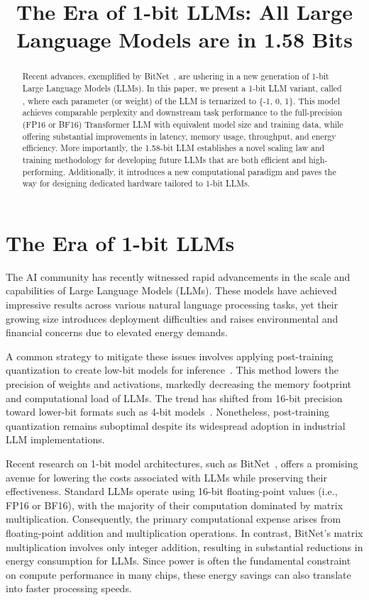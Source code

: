 \title{The Era of 1-bit LLMs: All Large Language Models are in 1.58 Bits}

\begin{abstract}
Recent advances, exemplified by BitNet~\cite{bitnet}, are ushering in a new generation of 1-bit Large Language Models (LLMs). In this paper, we present a 1-bit LLM variant, called \textbf{}, where each parameter (or weight) of the LLM is ternarized to \{-1, 0, 1\}. This model achieves comparable perplexity and downstream task performance to the full-precision (FP16 or BF16) Transformer LLM with equivalent model size and training data, while offering substantial improvements in latency, memory usage, throughput, and energy efficiency. More importantly, the 1.58-bit LLM establishes a novel scaling law and training methodology for developing future LLMs that are both efficient and high-performing. Additionally, it introduces a new computational paradigm and paves the way for designing dedicated hardware tailored to 1-bit LLMs.
\end{abstract}

\section{The Era of 1-bit LLMs}

The AI community has recently witnessed rapid advancements in the scale and capabilities of Large Language Models (LLMs). These models have achieved impressive results across various natural language processing tasks, yet their growing size introduces deployment difficulties and raises environmental and financial concerns due to elevated energy demands.

A common strategy to mitigate these issues involves applying post-training quantization to create low-bit models for inference~\cite{smoothquant, gptq, quip, quip_sharp}. This method lowers the precision of weights and activations, markedly decreasing the memory footprint and computational load of LLMs. The trend has shifted from 16-bit precision toward lower-bit formats such as 4-bit models~\cite{gptq, awq}. Nonetheless, post-training quantization remains suboptimal despite its widespread adoption in industrial LLM implementations.

Recent research on 1-bit model architectures, such as BitNet~\cite{bitnet}, offers a promising avenue for lowering the costs associated with LLMs while preserving their effectiveness. Standard LLMs operate using 16-bit floating-point values (i.e., FP16 or BF16), with the majority of their computation dominated by matrix multiplication. Consequently, the primary computational expense arises from floating-point addition and multiplication operations. In contrast, BitNet’s matrix multiplication involves only integer addition, resulting in substantial reductions in energy consumption for LLMs. Since power is often the fundamental constraint on compute performance in many chips, these energy savings can also translate into faster processing speeds.

